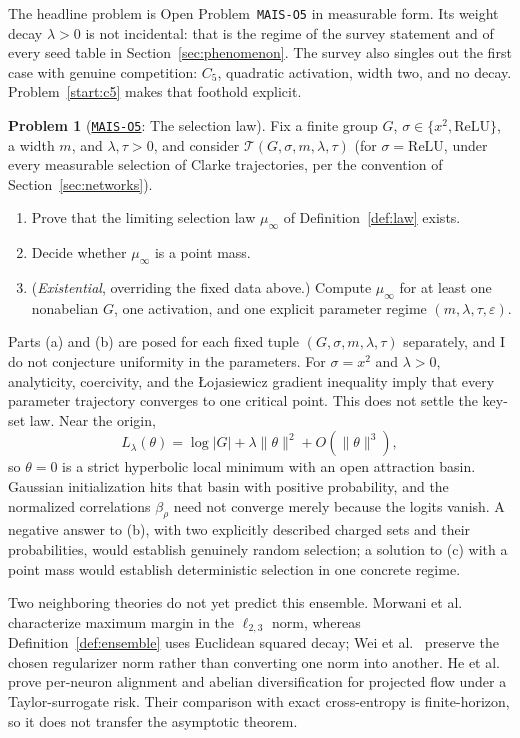 \documentclass[11pt]{amsart}
\newcommand{\Oid}[1]{\href{https://github.com/lionellevine/MAIS/blob/main/open-problems/MAIS-O#1.md}{\texttt{MAIS-O#1}}}
\theoremstyle{plain}
\theoremstyle{definition}
\newtheorem{problem}[theorem]{Problem}
\begin{document}
The headline problem is Open Problem~\texttt{MAIS-O5} in measurable form. Its weight decay $\lambda > 0$ is not incidental: that is the regime of the survey statement and of every seed table in Section~\ref{sec:phenomenon}. The survey also singles out the first case with genuine competition: $C_5$, quadratic activation, width two, and no decay. Problem~\ref{start:c5} makes that foothold explicit.

\begin{problem}[\Oid{5}: The selection law]\label{prob:law}
Fix a finite group $G$, $\sigma \in \{x^2, \mathrm{ReLU}\}$, a width $m$, and $\lambda, \tau > 0$, and consider $\mathcal{T}(G,\sigma,m,\lambda,\tau)$ (for $\sigma = \mathrm{ReLU}$, under every measurable selection of Clarke trajectories, per the convention of Section~\ref{sec:networks}).
\begin{enumerate}
\item[(a)] Prove that the limiting selection law $\mu_\infty$ of Definition~\ref{def:law} exists.
\item[(b)] Decide whether $\mu_\infty$ is a point mass.
\item[(c)] (\emph{Existential}, overriding the fixed data above.) Compute $\mu_\infty$ for at least one nonabelian $G$, one activation, and one explicit parameter regime $(m, \lambda, \tau, \varepsilon)$.
\end{enumerate}
\end{problem}

Parts (a) and (b) are posed for each fixed tuple $(G,\sigma,m,\lambda,\tau)$ separately, and I do not conjecture uniformity in the parameters. For $\sigma=x^2$ and $\lambda>0$, analyticity, coercivity, and the {\L}ojasiewicz gradient inequality \cite{lojasiewicz1984} imply that every parameter trajectory converges to one critical point. This does not settle the key-set law. Near the origin,
\[
L_\lambda(\theta)=\log|G|+\lambda\|\theta\|^2+O(\|\theta\|^3),
\]
so $\theta=0$ is a strict hyperbolic local minimum with an open attraction basin. Gaussian initialization hits that basin with positive probability, and the normalized correlations $\beta_\rho$ need not converge merely because the logits vanish. A negative answer to (b), with two explicitly described charged sets and their probabilities, would establish genuinely random selection; a solution to (c) with a point mass would establish deterministic selection in one concrete regime.

Two neighboring theories do not yet predict this ensemble. Morwani et al.~\cite{morwani2024} characterize maximum margin in the $\ell_{2,3}$ norm, whereas Definition~\ref{def:ensemble} uses Euclidean squared decay; Wei et al.~\cite{wei2019} preserve the chosen regularizer norm rather than converting one norm into another. He et al.~\cite{he2026spectral} prove per-neuron alignment and abelian diversification for projected flow under a Taylor-surrogate risk. Their comparison with exact cross-entropy is finite-horizon, so it does not transfer the asymptotic theorem.
\end{document}
